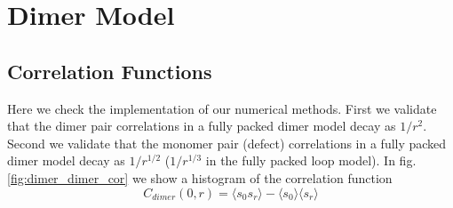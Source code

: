\documentclass[aps,floatfix,11pt]{revtex4-1}
\begin{document}


%





\section{Dimer Model}

\subsection{Correlation Functions}

Here we check the implementation of our numerical methods. First we validate that the dimer pair
correlations in a fully packed dimer model decay as $1/r^2$. Second we validate that the monomer
pair (defect) correlations in a fully packed dimer model decay as $1/r^{1/2}$ ($1/r^{1/3}$ in the
fully packed loop model). In fig. \ref{fig:dimer_dimer_cor} we show a histogram of the correlation
function 
\begin{equation}
    \label{}
    C_{dimer}(0,r) = \langle s_0 s_r \rangle -\langle s_0 \rangle \langle s_r \rangle
\end{equation}
\end{document}
